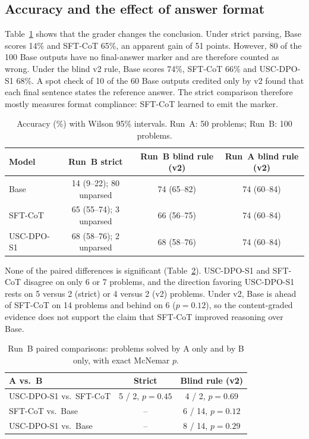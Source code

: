\documentclass[11pt, a4paper]{article}
\newcommand{\soldpo}{USC-DPO-S1}
\begin{document}
\subsection{Accuracy and the effect of answer format}
Table~\ref{tab:acc} shows that the grader changes the conclusion. Under strict parsing, Base scores 14\% and SFT-CoT 65\%, an apparent gain of 51 points. However, 80 of the 100 Base outputs have no final-answer marker and are therefore counted as wrong. Under the blind v2 rule, Base scores 74\%, SFT-CoT 66\% and \soldpo{} 68\%. A spot check of 10 of the 60 Base outputs credited only by v2 found that each final sentence states the reference answer. The strict comparison therefore mostly measures format compliance: SFT-CoT learned to emit the marker.

\begin{table}[t]
\centering
\caption{Accuracy (\%) with Wilson 95\% intervals. Run~A: 50 problems; Run~B: 100 problems.}
\label{tab:acc}
\small
\begin{tabular}{lccc}
\toprule
\textbf{Model} & \textbf{Run~B strict} & \textbf{Run~B blind rule (v2)} & \textbf{Run~A blind rule (v2)} \\
\midrule
Base & 14 (9--22); 80 unparsed & 74 (65--82) & 74 (60--84) \\
SFT-CoT & 65 (55--74); 3 unparsed & 66 (56--75) & 74 (60--84) \\
\soldpo{} & 68 (58--76); 2 unparsed & 68 (58--76) & 74 (60--84) \\
\bottomrule
\end{tabular}
\end{table}

None of the paired differences is significant (Table~\ref{tab:paired}). \soldpo{} and SFT-CoT disagree on only 6 or 7 problems, and the direction favoring \soldpo{} rests on 5 versus 2 (strict) or 4 versus 2 (v2) problems. Under v2, Base is ahead of SFT-CoT on 14 problems and behind on 6 ($p=0.12$), so the content-graded evidence does not support the claim that SFT-CoT improved reasoning over Base.

\begin{table}[t]
\centering
\caption{Run~B paired comparisons: problems solved by A only and by B only, with exact McNemar $p$.}
\label{tab:paired}
\small
\begin{tabular}{lcc}
\toprule
\textbf{A vs.\ B} & \textbf{Strict} & \textbf{Blind rule (v2)} \\
\midrule
\soldpo{} vs.\ SFT-CoT & 5 / 2, $p=0.45$ & 4 / 2, $p=0.69$ \\
SFT-CoT vs.\ Base & -- & 6 / 14, $p=0.12$ \\
\soldpo{} vs.\ Base & -- & 8 / 14, $p=0.29$ \\
\bottomrule
\end{tabular}
\end{table}
\end{document}
